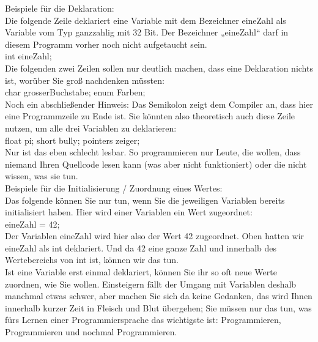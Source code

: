 Beispiele für die Deklaration:\\

Die folgende Zeile deklariert eine Variable mit dem Bezeichner eineZahl als Variable vom Typ ganzzahlig mit 32 Bit. Der Bezeichner „eineZahl“ darf in diesem Programm vorher noch nicht aufgetaucht sein.\\

int eineZahl;\\

Die folgenden zwei Zeilen sollen nur deutlich machen, dass eine Deklaration nichts ist, worüber Sie groß nachdenken müssten:\\

char grosserBuchstabe;
enum Farben;\\

Noch ein abschließender Hinweis: Das Semikolon zeigt dem Compiler an, dass hier eine Programmzeile zu Ende ist. Sie könnten also theoretisch auch diese Zeile nutzen, um alle drei Variablen zu deklarieren:\\

float pi; short bully; pointers zeiger;\\

Nur ist das eben schlecht lesbar. So programmieren nur Leute, die wollen, dass niemand Ihren Quellcode lesen kann (was aber nicht funktioniert) oder die nicht wissen, was sie tun.\\

Beispiele für die Initialisierung / Zuordnung eines Wertes:\\

Das folgende können Sie nur tun, wenn Sie die jeweiligen Variablen bereits initialisiert haben. Hier wird einer Variablen ein Wert zugeordnet:\\

eineZahl = 42;\\

Der Variablen eineZahl wird hier also der Wert 42 zugeordnet. Oben hatten wir eineZahl als int deklariert. Und da 42 eine ganze Zahl und innerhalb des Wertebereichs von int ist, können wir das tun.\\

Ist eine Variable erst einmal deklariert, können Sie ihr so oft neue Werte zuordnen, wie Sie wollen. Einsteigern fällt der Umgang mit Variablen deshalb manchmal etwas schwer, aber machen Sie sich da keine Gedanken, das wird Ihnen innerhalb kurzer Zeit in Fleisch und Blut übergehen; Sie müssen nur das tun, was fürs Lernen einer Programmiersprache das wichtigste ist: Programmieren, Programmieren und nochmal Programmieren.\\

